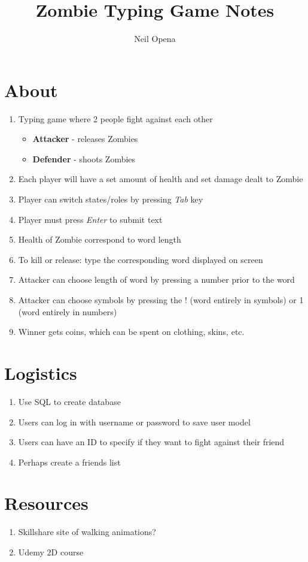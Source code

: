 \documentclass[10pt]{article}
\title{Zombie Typing Game Notes}
\author{Neil Opena}
\date{}
\begin{document}
\maketitle

\section*{About}
\begin{enumerate}
    \item Typing game where 2 people fight against each other
    \begin{itemize}
        \item \textbf{Attacker} - releases Zombies
        \item \textbf{Defender} - shoots Zombies
    \end{itemize}
    \item Each player will have a set amount of health and set damage dealt to Zombie
    \item Player can switch states/roles by pressing \textit{Tab} key
    \item Player must press \textit{Enter} to submit text
    \item Health of Zombie correspond to word length
    \item To kill or release: type the corresponding word displayed on screen
    \item Attacker can choose length of word by pressing a number prior to the word
    \item Attacker can choose symbols by pressing the ! (word entirely in symbols) or 1 (word entirely in numbers)
    \item Winner gets coins, which can be spent on clothing, skins, etc.
\end{enumerate}

\section*{Logistics}
\begin{enumerate}
    \item Use SQL to create database
    \item Users can log in with username or password to save user model
    \item Users can have an ID to specify if they want to fight against their friend
    \item Perhaps create a friends list
\end{enumerate}

\section*{Resources}
\begin{enumerate}
    \item Skillshare site of walking animations?
    \item Udemy 2D course
\end{enumerate}
\end{document}
